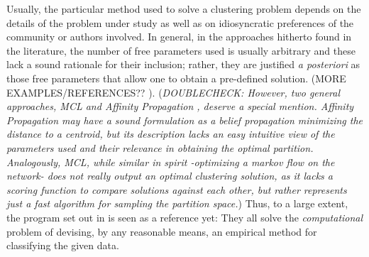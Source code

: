 \documentclass[twocolumn,aps,sort,nofootinbib]{revtex4}
\begin{document}
Usually,
the particular method used to solve a clustering problem
depends on the details of
the problem under study as well as on idiosyncratic 
preferences of the community or authors involved. In general,
in the approaches hitherto found in the literature,
the number of free parameters used is
usually arbitrary and these lack a sound rationale for
their inclusion; rather, they are justified {\sl a posteriori}
as those free parameters that allow one to obtain a 
pre-defined solution\cite{Schaeffer07}. 
(MORE EXAMPLES/REFERENCES?? ). 
({\sl DOUBLECHECK: 
However, two general approaches, 
MCL \cite{MCL} and Affinity Propagation \cite{AffinityPropagation}, 
deserve
a special mention. Affinity Propagation may
have a sound formulation as a 
belief propagation minimizing the distance to a centroid,
but its description lacks an easy intuitive
view of the parameters 
used and their relevance in obtaining  the optimal partition.
Analogously, MCL, while similar in spirit -optimizing a markov flow
on the network- does not really output an optimal clustering
solution, as it lacks a scoring function to compare solutions against
each other, but rather represents just a fast algorithm for sampling
the partition space.})
Thus, to a large
extent, the program set out in \cite{Lance67-1,Lance67-2} is seen as
a reference yet: They all solve the {\sl computational} problem of 
devising, by any reasonable means, an empirical method for
classifying the given data\cite{Lance67-2}.
\end{document}
